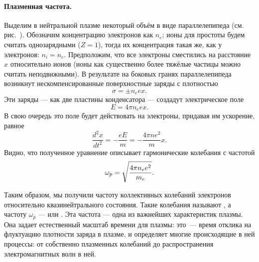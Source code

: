 \paragraph{Плазменная частота.}
Выделим в нейтральной плазме некоторый объём в виде параллелепипеда
(см. рис.~).
Обозначим концентрацию электронов как $n_e$; ионы для простоты будем считать
однозарядными ($Z=1$), тогда их концентрация такая же, как у электронов: $n_i=n_e$.
Предположим, что все электроны сместились на расстояние $x$ относительно ионов
(ионы как существенно более тяжёлые частицы можно считать неподвижными).
В результате на боковых гранях параллелепипеда возникнут нескомпенсированные
поверхностные заряды с плотностью
\begin{equation*}
    \sigma = \pm n_e e x.
\end{equation*}
Эти заряды --- как две пластины конденсатора --- создадут электрическое поле
\begin{equation*}
    E=4\pi n_e e x.
\end{equation*}
В свою очередь это поле будет действовать на электроны,
придавая им ускорение, равное
\begin{equation*}
    \frac{d^2x}{dt^2}=-\frac{eE}{m}=-\frac{4\pi ne^2}{m}x.
\end{equation*}
Видно, что полученное уравнение описывает гармонические колебания с частотой
\begin{equation}
    \eqmark{5.16}
    \omega_p=\sqrt{\frac{4\pi n_e e^2}{m_e}}.
\end{equation}

Таким образом, мы получили частоту коллективных колебаний
электронов относительно квазинейтрального состояния. Такие колебания
называют , а частоту $\omega_p$ ---
 или . Эта частота ---
одна из важнейших характеристик плазмы.
Она задает естественный масштаб времени для плазмы: это~--- время
отклика на флуктуацию плотности заряда в плазме,
и определяет многие происходящие в ней процессы: от собственно плазменных
колебаний до распространения электромагнитных волн в ней.


